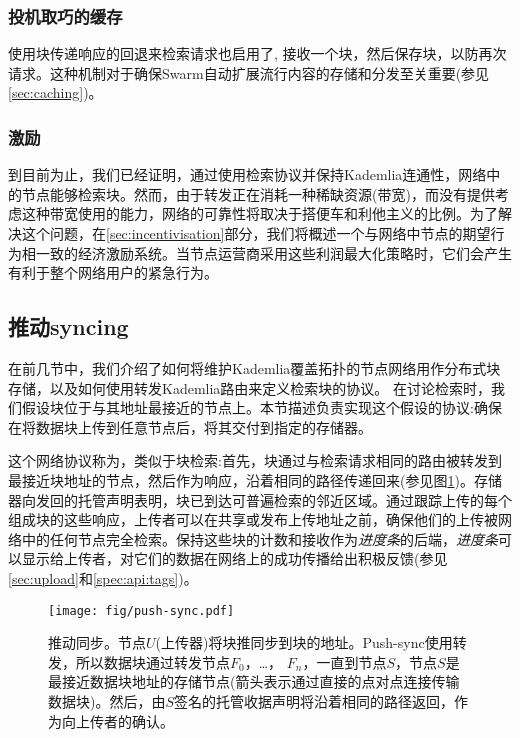 \subsubsection{投机取巧的缓存}

使用块传递响应的回退来检索请求也启用了, 接收一个块，然后保存块，以防再次请求。这种机制对于确保Swarm自动扩展流行内容的存储和分发至关重要(参见\ref{sec:caching})。

\subsubsection{激励}

到目前为止，我们已经证明，通过使用检索协议并保持Kademlia连通性，网络中的节点能够检索块。然而，由于转发正在消耗一种稀缺资源(带宽)，而没有提供考虑这种带宽使用的能力，网络的可靠性将取决于搭便车和利他主义的比例。为了解决这个问题，在\ref{sec:incentivisation}部分，我们将概述一个与网络中节点的期望行为相一致的经济激励系统。当节点运营商采用这些利润最大化策略时，它们会产生有利于整个网络用户的紧急行为。
 
\subsection{推动syncing\statusgreen}\label{sec:push-syncing}
 
在前几节中，我们介绍了如何将维护Kademlia覆盖拓扑的节点网络用作分布式块存储，以及如何使用转发Kademlia路由来定义检索块的协议。
在讨论检索时，我们假设块位于与其地址最接近的节点上。本节描述负责实现这个假设的协议:确保在将数据块上传到任意节点后，将其交付到指定的存储器。

这个网络协议称为，类似于块检索:首先，块通过与检索请求相同的路由被转发到最接近块地址的节点，然后作为响应，沿着相同的路径传递回来(参见图\ref{fig:push-syncing})。存储器向发回的托管声明表明，块已到达可普遍检索的邻近区域。通过跟踪上传的每个组成块的这些响应，上传者可以在共享或发布上传地址之前，确保他们的上传被网络中的任何节点完全检索。保持这些块的计数和接收作为\emph{进度条}的后端，\emph{进度条}可以显示给上传者，对它们的数据在网络上的成功传播给出积极反馈(参见\ref{sec:upload}和\ref{spec:api:tags})。


\begin{figure}[htbp]
   \centering
   \texttt{[image: fig/push-sync.pdf]}
   \caption[推动同步\statusgreen]{推动同步。节点$U$(上传器)将块推同步到块的地址。Push-sync使用转发，所以数据块通过转发节点$F_0$，…， $F_n$，一直到节点$S$，节点$S$是最接近数据块地址的存储节点(箭头表示通过直接的点对点连接传输数据块)。然后，由$S$签名的托管收据声明将沿着相同的路径返回，作为向上传者的确认。}
   \label{fig:push-syncing}
\end{figure}

